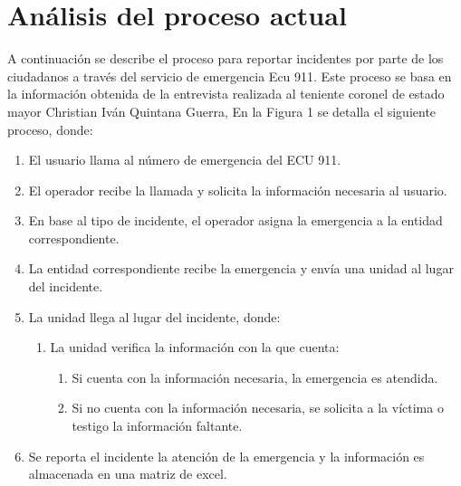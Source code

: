 

\section{Análisis del proceso actual}
A continuación se describe el proceso para reportar incidentes por parte de los ciudadanos a través del servicio
de emergencia Ecu 911. Este proceso se basa en la información obtenida de la entrevista realizada al teniente
coronel de estado mayor Christian Iván Quintana Guerra, En la Figura 1 se detalla el siguiente proceso, donde:

\begin{enumerate}
    \item El usuario llama al número de emergencia del ECU 911.
    \item El operador recibe la llamada y solicita la información necesaria al usuario.
    \item En base al tipo de incidente, el operador asigna la emergencia a la entidad correspondiente.
    \item La entidad correspondiente recibe la emergencia y envía una unidad al lugar del incidente.
    \item La unidad llega al lugar del incidente, donde:
          \begin{enumerate}
              \item La unidad verifica la información con la que cuenta:
                    \begin{enumerate}
                        \item Si cuenta con la información necesaria, la emergencia es atendida.
                        \item Si no cuenta con la información necesaria, se solicita a la víctima o testigo la información faltante.
                    \end{enumerate}
          \end{enumerate}
    \item Se reporta el incidente la atención de la emergencia y la información es almacenada en una matriz de excel.
\end{enumerate}


